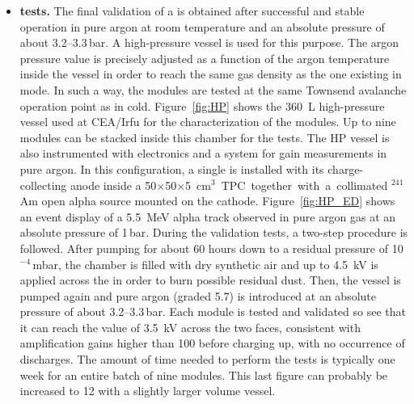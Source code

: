 \begin{itemize}
\item {\bf {} tests.} The final validation of a  is obtained after  successful and stable operation in pure argon at room temperature and an absolute pressure of about \numrange{3.2}{3.3}\,bar. A high-pressure vessel is used for this purpose.  The argon pressure value is precisely adjusted as a function of the argon temperature inside the vessel in order to reach the same gas density as the one existing in \dual \lar mode. In such a way, the  modules are tested at the same Townsend avalanche operation point as in cold. Figure~\ref{fig:HP} shows the \SI{360}{L} high-pressure vessel used at CEA/Irfu for the characterization of the    modules. Up to nine  modules can be stacked inside this chamber for the  tests. The HP vessel is also instrumented with  electronics and a  system for gain measurements in pure argon. In this configuration, a single  is installed with its \twod charge-collecting anode inside 
a \num{50}$\times$\num{50}$\times$\SI{5}{cm$^3$} 
TPC together with a collimated $^{241}$Am open alpha source mounted on 
the cathode. Figure~\ref{fig:HP_ED} shows an event display of a \SI{5.5}{MeV} alpha track observed in pure argon gas at an 
absolute pressure of \num{1}\,bar.
%
During the  validation  tests, a two-step procedure is followed. After pumping for 
about \num{60} hours down to a residual pressure of \num{10}$^{-4}$\,mbar, the chamber is filled with dry synthetic air and 
  up to \SI{4.5}{kV} is applied across the  in order to 
burn possible residual dust. Then, the vessel is pumped again and pure argon (graded \num{5.7})
is introduced at an absolute pressure of about \numrange{3.2}{3.3}\,bar. Each  module is tested 
and validated so see that it can reach the value of \SI{3.5}{kV} across the two faces, consistent with amplification gains higher than \num{100} before charging up, with no occurrence of discharges. The amount of time needed to perform the   tests is 
typically one week for an entire batch of nine  modules. This last figure can probably be increased to \num{12} with a slightly larger volume vessel. 
\end{itemize}

